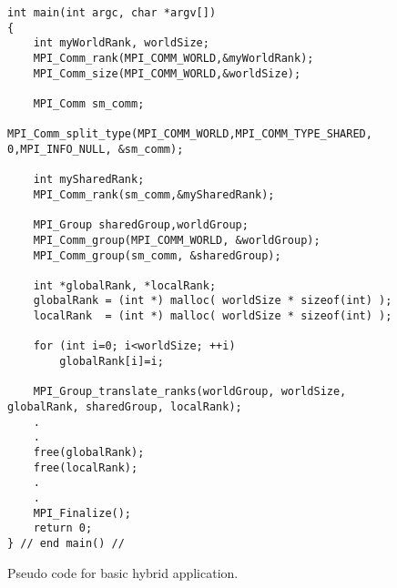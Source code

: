 \begin{figure} [t!]
\centering
\captionsetup{justification=centering, singlelinecheck=false}
\begin{lstlisting}[style=CStyle]
int main(int argc, char *argv[])
{
    int myWorldRank, worldSize;
    MPI_Comm_rank(MPI_COMM_WORLD,&myWorldRank);
    MPI_Comm_size(MPI_COMM_WORLD,&worldSize);
    
    MPI_Comm sm_comm;
    MPI_Comm_split_type(MPI_COMM_WORLD,MPI_COMM_TYPE_SHARED, 0,MPI_INFO_NULL, &sm_comm);

    int mySharedRank;
    MPI_Comm_rank(sm_comm,&mySharedRank);

    MPI_Group sharedGroup,worldGroup;
    MPI_Comm_group(MPI_COMM_WORLD, &worldGroup);
    MPI_Comm_group(sm_comm, &sharedGroup);
    
    int *globalRank, *localRank;
    globalRank = (int *) malloc( worldSize * sizeof(int) );
    localRank  = (int *) malloc( worldSize * sizeof(int) );
    
    for (int i=0; i<worldSize; ++i) 
        globalRank[i]=i;

    MPI_Group_translate_ranks(worldGroup, worldSize, globalRank, sharedGroup, localRank);
    .
    .
    free(globalRank);
    free(localRank);
    .
    .
    MPI_Finalize();
    return 0;
} // end main() //
\end{lstlisting}    
\caption{Pseudo code for basic hybrid application.}
\label{fig:PseudoCode2}
\end{figure}





\begin{comment}

\begin{outline}
    \item {\bf MPI functions for shared memory }\\
      Description and use of the most relevant functions for shared memory introduced in MPI-3
    \item {\bf Shared Memory Allocation} \\
    Contiguous versus Noncontiguous memory allocation schemes\\
    Advantages and disadvantages\\
    Recommendations
    \item {\bf Relationship to Remote Memory Access }
      \begin{outline}
        \item {\bf Remote Memory Access Windows}
      \end{outline}
    \item {\bf Synchronization Techniques} \\
    Difference between $\textbf{MPI\_Win\_fence()}$ and $\textbf{MPI\_Win\_sync()}$

\end{outline}

\end{comment}

